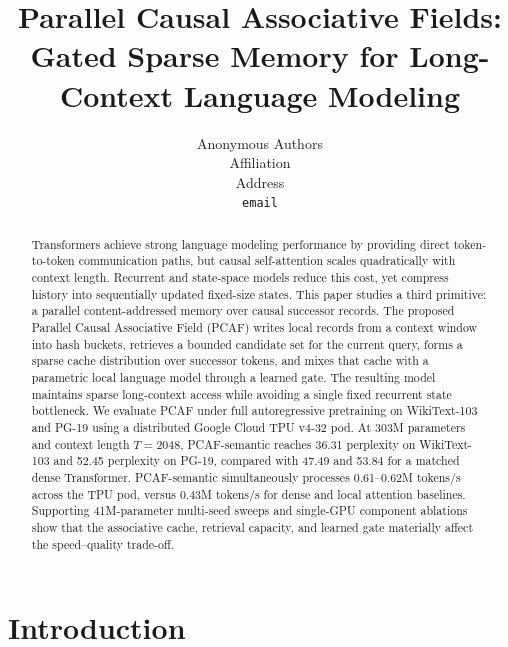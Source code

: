 \documentclass{article}
\title{Parallel Causal Associative Fields:\\
Gated Sparse Memory for Long-Context Language Modeling}
\author{Anonymous Authors \\
Affiliation \\
Address \\
\texttt{email}
}
\begin{document}
\raggedbottom
\maketitle

\begin{abstract}
Transformers achieve strong language modeling performance by providing direct
token-to-token communication paths, but causal self-attention scales
quadratically with context length. Recurrent and state-space models reduce this
cost, yet compress history into sequentially updated fixed-size states. This
paper studies a third primitive: a parallel content-addressed memory over causal
successor records. The proposed Parallel Causal Associative Field (PCAF) writes
local records from a context window into hash buckets, retrieves a bounded
candidate set for the current query, forms a sparse cache distribution over
successor tokens, and mixes that cache with a parametric local language model
through a learned gate. The resulting model maintains sparse long-context access
while avoiding a single fixed recurrent state bottleneck.
We evaluate PCAF under full autoregressive pretraining on WikiText-103 and
PG-19 using a distributed Google Cloud TPU v4-32 pod. At 303M parameters and
context length $T{=}2048$, PCAF-semantic reaches 36.31 perplexity on
WikiText-103 and 52.45 perplexity on PG-19, compared with 47.49 and 53.84 for
a matched dense Transformer. PCAF-semantic simultaneously processes
0.61--0.62M tokens/s across the TPU pod, versus 0.43M tokens/s for dense and
local attention baselines. Supporting 41M-parameter multi-seed sweeps and
single-GPU component ablations show that the associative cache, retrieval
capacity, and learned gate materially affect the speed--quality trade-off.
\end{abstract}

\section{Introduction}
\end{document}
